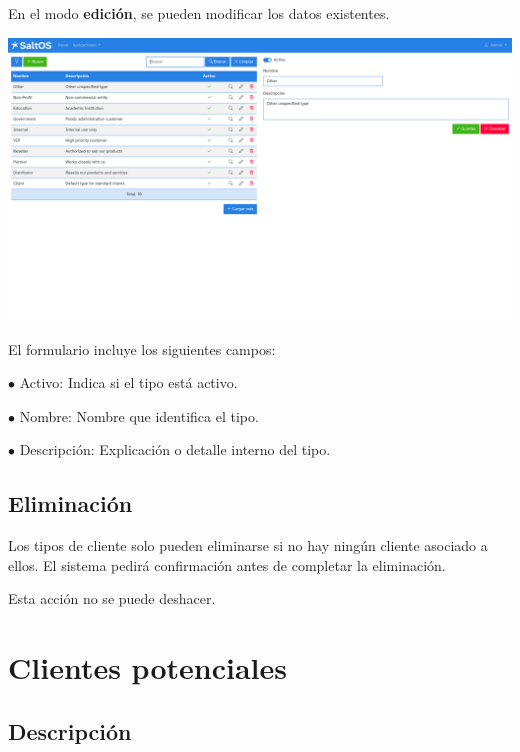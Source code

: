 \documentclass[a4paper]{article}
\begin{document}
En el modo \textbf{edición}, se pueden modificar los datos existentes.

\begin{center}\includegraphics[width=1\textwidth]{../ujest/snaps/test-screenshots-js-screenshots-crm-customers-types-edit-10-es-es-1-snap.png}\end{center}

El formulario incluye los siguientes campos:

\begin{compactitem}
\item[\color{myblue}$\bullet$] Activo: Indica si el tipo está activo.
\item[\color{myblue}$\bullet$] Nombre: Nombre que identifica el tipo.
\item[\color{myblue}$\bullet$] Descripción: Explicación o detalle interno del tipo.
\end{compactitem}

\hypertarget{toc55}{}
\subsection{Eliminación}

Los tipos de cliente solo pueden eliminarse si no hay ningún cliente asociado a ellos.
El sistema pedirá confirmación antes de completar la eliminación.

Esta acción no se puede deshacer.


\hypertarget{toc56}{}
\section{Clientes potenciales}

\hypertarget{toc57}{}
\subsection{Descripción}
\end{document}
